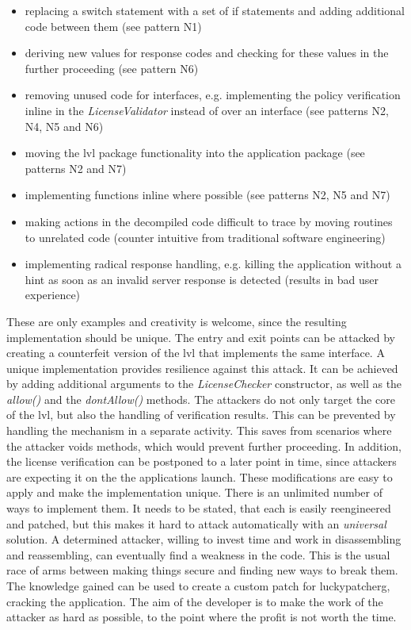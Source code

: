 \begin{itemize}
\item replacing a switch statement with a set of if statements and adding additional code between them (see pattern N1)
\item deriving new values for response codes and checking for these values in the further proceeding (see pattern N6)
\item removing unused code for interfaces, e.g. implementing the policy verification inline in the \textit{LicenseValidator} instead of over an interface (see patterns N2, N4, N5 and N6)
\item moving the \gls{lvl} package functionality into the application package (see patterns N2 and N7)
\item implementing functions inline where possible (see patterns N2, N5 and N7)
\item making actions in the decompiled code difficult to trace by moving routines to unrelated code (counter intuitive from traditional software engineering)
\item implementing radical response handling, e.g. killing the application without a hint as soon as an invalid server response is detected (results in bad user experience)
\end{itemize}
These are only examples and creativity is welcome, since the resulting implementation should be unique. \cite{developersSecuring}
\newline
The entry and exit points can be attacked by creating a counterfeit version of the \gls{lvl} that implements the same interface.
A unique implementation provides resilience against this attack.
It can be achieved by adding additional arguments to the \textit{LicenseChecker} constructor, as well as the \textit{allow()} and the \textit{dontAllow()} methods. \cite{developersSecuring}
\newline
The attackers do not only target the core of the \gls{lvl}, but also the handling of verification results.
This can be prevented by handling the mechanism in a separate activity.
This saves from scenarios where the attacker voids methods, which would prevent further proceeding.
In addition, the license verification can be postponed to a later point in time, since attackers are expecting it on the the applications launch. \cite{developersSecuring}
\newline
These modifications are easy to apply and make the implementation unique.
There is an unlimited number of ways to implement them.
It needs to be stated, that each is easily reengineered and patched, but this makes it hard to attack automatically with an \textit{universal} solution.
A determined attacker, willing to invest time and work in disassembling and reassembling, can eventually find a weakness in the code.
This is the usual race of arms between making things secure and finding new ways to break them.
The knowledge gained can be used to create a custom patch for \gls{luckypatcherg}, cracking the application.
The aim of the developer is to make the work of the attacker as hard as possible, to the point where the profit is not worth the time. \cite{developersSecuring}
